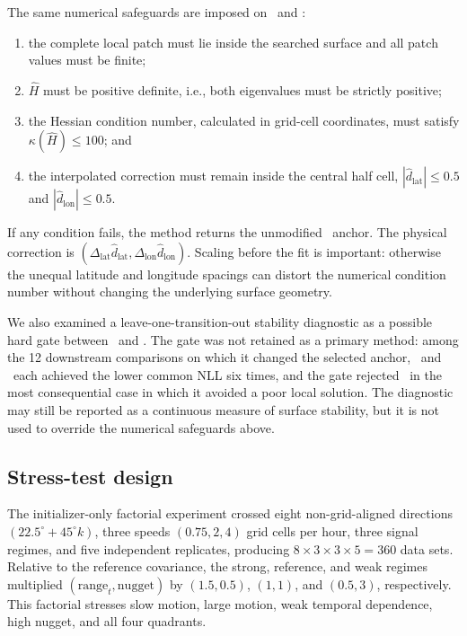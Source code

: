 The same numerical safeguards are imposed on \Qthree\ and \Qfive:
\begin{enumerate}
 \item the complete local patch must lie inside the searched surface and all
       patch values must be finite;
 \item $\widehat H$ must be positive definite, i.e., both eigenvalues must be
       strictly positive;
 \item the Hessian condition number, calculated in grid-cell coordinates,
       must satisfy $\kappa(\widehat H)\leq100$; and
 \item the interpolated correction must remain inside the central half cell,
       $|\widehat d_{\mathrm{lat}}|\leq0.5$ and
       $|\widehat d_{\mathrm{lon}}|\leq0.5$.
\end{enumerate}
If any condition fails, the method returns the unmodified \Mthree\ anchor.
The physical correction is
$(\Delta_{\mathrm{lat}}\widehat d_{\mathrm{lat}},
\Delta_{\mathrm{lon}}\widehat d_{\mathrm{lon}})$.
Scaling before the fit is important: otherwise the unequal latitude and
longitude spacings can distort the numerical condition number without changing
the underlying surface geometry.

We also examined a leave-one-transition-out stability diagnostic as a possible
hard gate between \Mthree\ and \Qthree.  The gate was not retained as a primary
method: among the 12 downstream comparisons on which it changed the selected
anchor, \Qthree\ and \Mthree\ each achieved the lower common NLL six times, and
the gate rejected \Qthree\ in the most consequential case in which it avoided
a poor local solution.  The diagnostic may still be reported as a continuous
measure of surface stability, but it is not used to override the numerical
safeguards above.

\subsection{Stress-test design}

The initializer-only factorial experiment crossed eight non-grid-aligned
directions $(22.5^\circ+45^\circ k)$, three speeds
$(0.75,2,4)$ grid cells per hour, three signal regimes, and five independent
replicates, producing $8\times3\times3\times5=360$ data sets.  Relative to the
reference covariance, the strong, reference, and weak regimes multiplied
$(\text{range}_{t},\text{nugget})$ by $(1.5,0.5)$, $(1,1)$, and $(0.5,3)$,
respectively.  This factorial stresses slow motion, large motion, weak temporal
dependence, high nugget, and all four quadrants.

